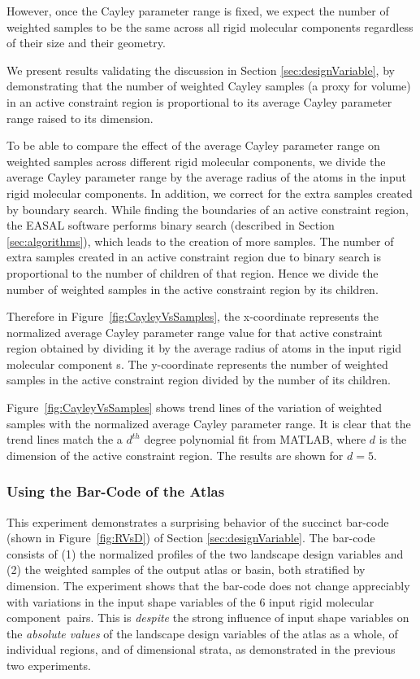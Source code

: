 \documentclass[]{article}
\newcommand{\figref}[1]{Figure~\ref{#1}}
\newcommand{\rmc}{rigid molecular component}
\begin{document}
However, once the Cayley parameter range is fixed, we expect the number of
weighted samples to be the same across all \rmc s regardless of their size and
their geometry.

We present results validating the discussion in Section
\ref{sec:designVariable}, by demonstrating that the number
of weighted Cayley samples (a proxy for volume) in an active constraint region
is proportional to its average Cayley parameter range raised to its dimension.

To be able to compare the effect of the average Cayley parameter range on
weighted samples across different \rmc s, we divide the average Cayley
parameter range by the average radius of the atoms in the input \rmc s.  In
addition, we correct for the extra samples created by boundary search.  While
finding the boundaries of an active constraint region, the EASAL software
performs binary search (described in Section \ref{sec:algorithms}), which leads
to the creation of more samples. The number of extra samples created in an
active constraint region due to binary search is proportional to the number of
children of that region. Hence we divide the number of weighted samples in the
active constraint region by its children.

Therefore in \figref{fig:CayleyVsSamples}, the x-coordinate represents the
normalized average Cayley parameter range value for that active constraint
region obtained by dividing it by the average radius of atoms in the input \rmc
s. The y-coordinate represents the number of weighted samples in the active
constraint region divided by the number of its children.

\figref{fig:CayleyVsSamples} shows trend lines of the variation of weighted
samples with the normalized average Cayley parameter range. It is clear that
the trend lines match the a $d^{th}$ degree polynomial fit from MATLAB, where
$d$ is the dimension of the active constraint region. The results are shown for
$d=5$.


\subsubsection{Using the Bar-Code of the Atlas}
\label{sec:geometricBarCode}
This experiment demonstrates a surprising behavior of the succinct bar-code
(shown in \figref{fig:RVsD}) of Section \ref{sec:designVariable}. The bar-code
consists of (1) the normalized profiles of the two landscape design variables
and (2) the weighted samples of the output atlas or basin, both stratified by
dimension. The experiment shows that the bar-code does not change appreciably
with variations in the input shape variables of the 6 input \rmc\ pairs. This
is {\sl despite} the strong influence of input shape variables on the {\sl
absolute values} of the landscape design variables of the atlas as a whole, of
individual regions, and of dimensional strata, as demonstrated in the previous
two experiments.
\end{document}
